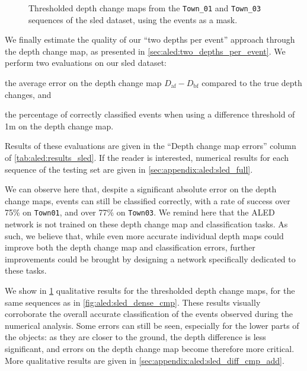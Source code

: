 \begin{figure}
  \cprotect\caption{Thresholded depth change maps from the \verb|Town_01| and \verb|Town_03| sequences of the \acrshort{sled} dataset, using the events as a mask.}\label{fig:aled:sled_diff_cmp}
\end{figure}

We finally estimate the quality of our ``two depths per event'' approach through the depth change map, as presented in \cref{sec:aled:two_depths_per_event}. We perform two evaluations on our \acrshort{sled} dataset:
\begin{enumerate*}[label=\textbf{(\arabic*)}]
  \item the average error on the depth change map \(D_\text{af}-D_\text{bf}\) compared to the true depth changes, and
  \item the percentage of correctly classified events when using a difference threshold of 1m on the depth change map.
\end{enumerate*}
Results of these evaluations are given in the ``Depth change map errors'' column of \cref{tab:aled:results_sled}. If the reader is interested, numerical results for each sequence of the testing set are given in \cref{sec:appendix:aled:sled_full}.

We can observe here that, despite a significant absolute error on the depth change maps, events can still be classified correctly, with a rate of success over 75\% on \verb|Town01|, and over 77\% on \verb|Town03|. We remind here that the ALED network is not trained on these depth change map and classification tasks. As such, we believe that, while even more accurate individual depth maps could improve both the depth change map and classification errors, further improvements could be brought by designing a network specifically dedicated to these tasks.

We show in \cref{fig:aled:sled_diff_cmp} qualitative results for the thresholded depth change maps, for the same sequences as in \cref{fig:aled:sled_dense_cmp}. These results visually corroborate the overall accurate classification of the events observed during the numerical analysis. Some errors can still be seen, especially for the lower parts of the objects: as they are closer to the ground, the depth difference is less significant, and errors on the depth change map become therefore more critical. More qualitative results are given in \cref{sec:appendix:aled:sled_diff_cmp_add}.


